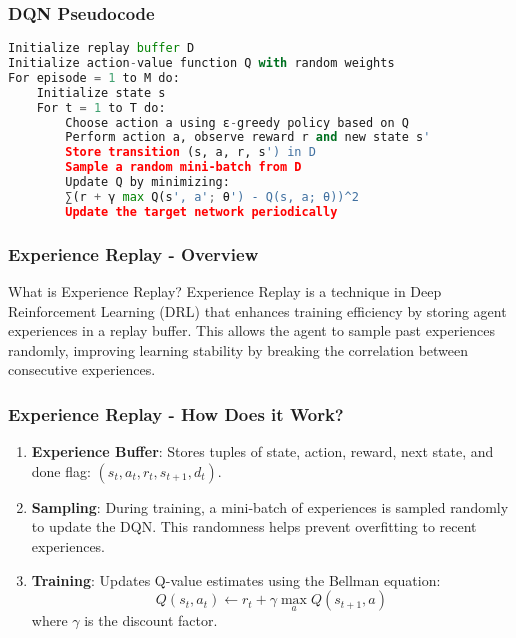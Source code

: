 \documentclass[aspectratio=169]{beamer}
\begin{document}
\begin{frame}[fragile]
  \frametitle{DQN Pseudocode}
  
  \begin{lstlisting}[language=python]
Initialize replay buffer D
Initialize action-value function Q with random weights
For episode = 1 to M do:
    Initialize state s
    For t = 1 to T do:
        Choose action a using ε-greedy policy based on Q
        Perform action a, observe reward r and new state s'
        Store transition (s, a, r, s') in D
        Sample a random mini-batch from D
        Update Q by minimizing:
        ∑(r + γ max Q(s', a'; θ') - Q(s, a; θ))^2
        Update the target network periodically
  \end{lstlisting}
\end{frame}

\begin{frame}[fragile]
    \frametitle{Experience Replay - Overview}
    \begin{block}{What is Experience Replay?}
        Experience Replay is a technique in Deep Reinforcement Learning (DRL) that enhances training efficiency by storing agent experiences in a replay buffer. 
        This allows the agent to sample past experiences randomly, improving learning stability by breaking the correlation between consecutive experiences.
    \end{block}
\end{frame}

\begin{frame}[fragile]
    \frametitle{Experience Replay - How Does it Work?}
    \begin{enumerate}
        \item \textbf{Experience Buffer}: Stores tuples of state, action, reward, next state, and done flag: 
        \( (s_t, a_t, r_t, s_{t+1}, d_t) \).
        
        \item \textbf{Sampling}: During training, a mini-batch of experiences is sampled randomly to update the DQN. 
        This randomness helps prevent overfitting to recent experiences.
        
        \item \textbf{Training}: Updates Q-value estimates using the Bellman equation:
        \begin{equation}
            Q(s_t, a_t) \leftarrow r_t + \gamma \max_a Q(s_{t+1}, a)
        \end{equation}
        where \( \gamma \) is the discount factor.
    \end{enumerate}
\end{frame}
\end{document}
